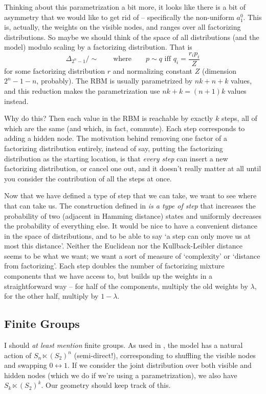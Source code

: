 \documentclass[11pt]{article}
\begin{document}
Thinking about this parametrization a bit more, it looks like there is a bit of
asymmetry that we would like to get rid of -- specifically the non-uniform
$a_1^0$.  This is, actually, the weights on the visible nodes, and ranges over
all factorizing distributions.  So maybe we should think of the space of
all distributions (and the model) modulo scaling by a factorizing distribution.
That is
\[
    \Delta_{2^n - 1} / \sim
    \qquad\text{where}\qquad
    p \sim q \text{ iff }
    q_i = \frac{r_i p_i}{Z}
\]
for some factorizing distribution $r$ and normalizing constant $Z$ (dimension
$2^n - 1 - n$, probably).  The RBM is usually parametrized by $nk + n + k$
values, and this reduction makes the parametrization use $nk +k = (n+1)k$ values
instead.

Why do this?  Then each value in the RBM is reachable by exactly $k$ steps, all
of which are the same (and which, in fact, commute).  Each step corresponds to
adding a hidden node.  The motivation behind removing one factor of a factorizing
distribution entirely, instead of say, putting the factorizing distribution as
the starting location, is that \textit{every step} can insert a new factorizing
distribution, or cancel one out, and it doesn't really matter at all until you
consider the contribution of all the steps at once.

Now that we have defined a type of step that we can take, we want to see where
that can take us.  The construction defined in \cite{MA10} \textit{is a type of
step} that increases the probability of two (adjacent in Hamming distance)
states and uniformly decreases the probability of everything else.  It would be
nice to have a convenient distance in the space of distributions, and to be able
to say `a step can only move us at most this distance'.  Neither the Euclidean
nor the Kullback-Leibler distance seems to be what we want; we want a sort of
measure of `complexity' or `distance from factorizing'.  Each step doubles the
number of factorizing mixture components that we have access to, but builds up
the weights in a straightforward way -- for half of the components, multiply the
old weights by $\lambda$, for the other half, multiply by $1 - \lambda$.

\subsection{Finite Groups}

I should \textit{at least mention} finite groups.  As used in \cite{CTY10}, the
model has a natural action of $S_n \ltimes (S_2)^n$ (semi-direct!),
corresponding to shuffling the visible nodes and swapping $0 \leftrightarrow 1$.
If we consider the joint distribution over both visible and hidden nodes (which
we do if we're using a parametrization), we also have $S_k \ltimes (S_2)^k$.
Our geometry should keep track of this.
\end{document}

